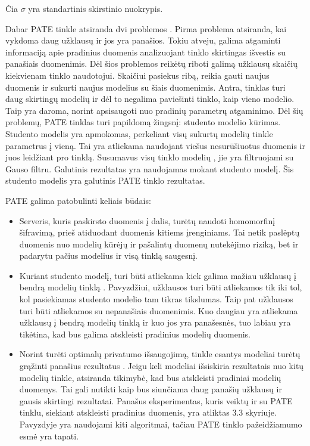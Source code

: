 \documentclass{VUMIFInfBakalaurinis}
\begin{document}
Čia $\sigma$ yra standartinis skirstinio nuokrypis. 
\par Dabar PATE tinkle atsiranda dvi problemos \cite{27}. Pirma problema atsiranda, kai vykdoma daug užklausų ir jos yra panašios. Tokiu atveju, galima atgaminti informaciją apie pradinius duomenis analizuojant tinklo skirtingas išvestis su panašiais duomenimis. Dėl šios problemos reikėtų riboti galimą užklausų skaičių kiekvienam tinklo naudotojui. Skaičiui pasiekus ribą, reikia gauti naujus duomenis ir sukurti naujus modelius su šiais duomenimis. Antra, tinklas turi daug skirtingų modelių ir dėl to negalima paviešinti tinklo, kaip vieno modelio. Taip yra daroma, norint apsisaugoti nuo pradinių parametrų atgaminimo. Dėl šių problemų, PATE tinklas turi papildomą žingsnį: studento modelio kūrimas. Studento modelis yra apmokomas, perkeliant visų sukurtų modelių tinkle parametrus į vieną. Tai yra atliekama naudojant viešus nesurūšiuotus duomenis ir juos leidžiant pro tinklą. Susumavus visų tinklo modelių , jie yra filtruojami su Gauso filtru. Galutinis rezultatas yra naudojamas mokant studento modelį. Šis studento modelis yra galutinis PATE tinklo rezultatas.
\par PATE galima patobulinti keliais būdais:
\begin{itemize}
    \item Serveris, kuris paskirsto duomenis į dalis, turėtų naudoti homomorfinį šifravimą, prieš atiduodant duomenis kitiems įrenginiams. Tai netik paslėptų duomenis nuo modelių kūrėjų ir pašalintų duomenų nutekėjimo riziką, bet ir padarytu pačius modelius ir visą tinklą saugesnį.
    \item Kuriant studento modelį, turi būti atliekama kiek galima mažiau užklausų į bendrą modelių tinklą \cite{26}. Pavyzdžiui, užklausos turi būti atliekamos tik iki tol, kol pasiekiamas studento modelio tam tikras tikslumas. Taip pat užklausos turi būti atliekamos su nepanašiais duomenimis. Kuo daugiau yra atliekama užklausų į bendrą modelių tinklą ir kuo jos yra panašesnės, tuo labiau yra tikėtina, kad bus galima atskleisti pradinius modelių duomenis.
    \item Norint turėti optimalų privatumo išsaugojimą, tinkle esantys modeliai turėtų grąžinti panašius rezultatus \cite{26}. Jeigu keli modeliai išsiskiria rezultatais nuo kitų modelių tinkle, atsiranda tikimybė, kad bus atskleisti pradiniai modelių duomenys. Tai gali nutikti kaip bus siunčiama daug panašių užklausų ir gausis skirtingi rezultatai. Panašus eksperimentas, kuris veiktų ir su PATE tinklu, siekiant atskleisti pradinius duomenis, yra atliktas 3.3 skyriuje. Pavyzdyje yra naudojami kiti algoritmai, tačiau PATE tinklo pažeidžiamumo esmė yra tapati.
\end{itemize}
\end{document}
